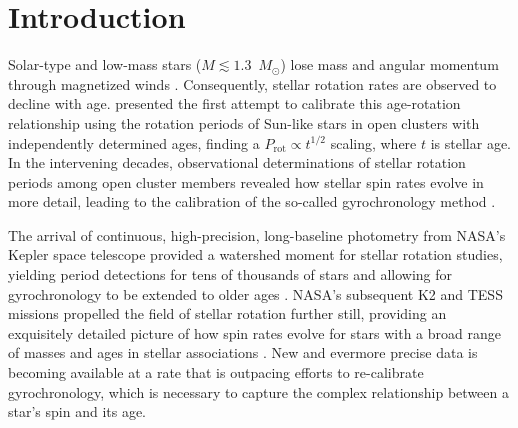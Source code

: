 \documentclass[linenumbers,tighten,trackchanges,twocolumn]{aastex631}
\newcommand{\msun}{$M_\odot$\xspace}
\begin{document}


\section{Introduction} \label{sec:intro}
Solar-type and low-mass stars ($M\lesssim1.3$~\msun) lose mass and angular momentum through magnetized winds \citep{Parker1958, WeberDavis1967, Mestel1968, Kawaler1988}. Consequently, stellar rotation rates are observed to decline with age. \citet{Skumanich1972} presented the first attempt to calibrate this age-rotation relationship using the rotation periods of Sun-like stars in open clusters with independently determined ages, finding a $P_\mathrm{rot} \propto t^{1/2}$ scaling, where $t$ is stellar age. In the intervening decades, observational determinations of stellar rotation periods among open cluster members revealed how stellar spin rates evolve in more detail, leading to the calibration of the so-called gyrochronology method \citep{Barnes2003, Barnes2007, Barnes2010, MamajekHillenbrand2008, Meibom2009}.

The arrival of continuous, high-precision, long-baseline photometry from NASA's Kepler space telescope \citep{Borucki2010} provided a watershed moment for stellar rotation studies, yielding period detections for tens of thousands of stars \citep[e.g.][]{Reinhold2013, McQuillan2014, Santos2021} and allowing for gyrochronology to be extended to older ages \citep[e.g.][]{Meibom2011, Meibom2015}. NASA's subsequent K2 \citep{Howell2014} and TESS \citep{Ricker2015} missions propelled the field of stellar rotation further still, providing an exquisitely detailed picture of how spin rates evolve for stars with a broad range of masses and ages in stellar associations \citep[e.g.][]{Douglas2016, Douglas2017, Douglas2019, Rebull2016, Rebull2017, Rebull2018, Rebull2020, Curtis2019a, Curtis2019b, Curtis2020}. New and evermore precise data is becoming available at a rate that is outpacing efforts to re-calibrate gyrochronology, which is necessary to capture the complex relationship between a star's spin and its age. 

\end{document}
